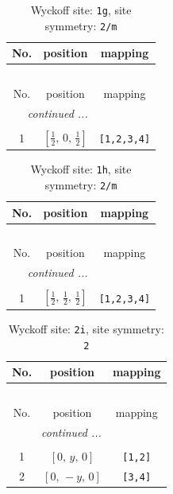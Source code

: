 \documentclass[fleqn,8pt]{jsarticle}
\begin{document}
\renewcommand{\arraystretch}{1.2}
\begin{longtable}{ccc}
\caption{Wyckoff site: {\tt 1g}, site symmetry: {\tt 2/m}}
 \\
 \hline \hline
No. & position & mapping \\ \hline \endfirsthead

\multicolumn{2}{l}{\tablename\ \thetable{}} \\
 \hline \hline
No. & position & mapping \\ \hline \endhead

 \hline \hline
\multicolumn{2}{r}{\footnotesize\it continued ...} \\ \endfoot

 \hline \hline
\multicolumn{2}{r}{} \\ \endlastfoot

1 & $\left[ \frac{1}{2},\, 0,\, \frac{1}{2} \right]$ & {\tt [1,2,3,4]} \\
\end{longtable}
\renewcommand{\arraystretch}{1.2}
\begin{longtable}{ccc}
\caption{Wyckoff site: {\tt 1h}, site symmetry: {\tt 2/m}}
 \\
 \hline \hline
No. & position & mapping \\ \hline \endfirsthead

\multicolumn{2}{l}{\tablename\ \thetable{}} \\
 \hline \hline
No. & position & mapping \\ \hline \endhead

 \hline \hline
\multicolumn{2}{r}{\footnotesize\it continued ...} \\ \endfoot

 \hline \hline
\multicolumn{2}{r}{} \\ \endlastfoot

1 & $\left[ \frac{1}{2},\, \frac{1}{2},\, \frac{1}{2} \right]$ & {\tt [1,2,3,4]} \\
\end{longtable}
\renewcommand{\arraystretch}{1.2}
\begin{longtable}{ccc}
\caption{Wyckoff site: {\tt 2i}, site symmetry: {\tt 2}}
 \\
 \hline \hline
No. & position & mapping \\ \hline \endfirsthead

\multicolumn{2}{l}{\tablename\ \thetable{}} \\
 \hline \hline
No. & position & mapping \\ \hline \endhead

 \hline \hline
\multicolumn{2}{r}{\footnotesize\it continued ...} \\ \endfoot

 \hline \hline
\multicolumn{2}{r}{} \\ \endlastfoot

1 & $\left[ 0,\, y,\, 0 \right]$ & {\tt [1,2]} \\ \hline
2 & $\left[ 0,\, - y,\, 0 \right]$ & {\tt [3,4]} \\
\end{longtable}
\end{document}
